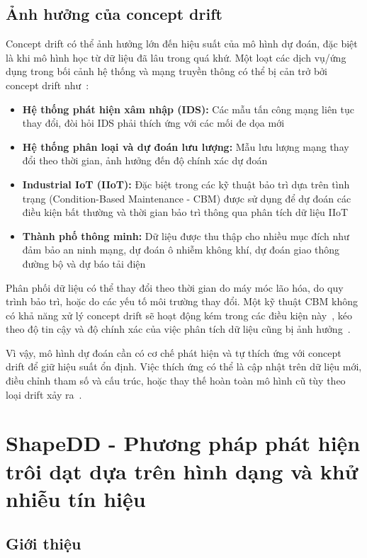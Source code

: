 \subsection{Ảnh hưởng của concept drift}
Concept drift có thể ảnh hưởng lớn đến hiệu suất của mô hình dự đoán, đặc biệt là khi mô hình học từ dữ liệu đã lâu trong quá khứ.
Một loạt các dịch vụ/ứng dụng trong bối cảnh hệ thống và mạng truyền thông có thể bị cản trở bởi concept drift như~\cite{ramakrishnan2014enabling}:

\begin{itemize}
	\item \textbf{Hệ thống phát hiện xâm nhập (IDS):} Các mẫu tấn công mạng liên tục thay đổi, đòi hỏi IDS phải thích ứng với các mối đe dọa mới
	\item \textbf{Hệ thống phân loại và dự đoán lưu lượng:} Mẫu lưu lượng mạng thay đổi theo thời gian, ảnh hưởng đến độ chính xác dự đoán
	\item \textbf{Industrial IoT (IIoT):} Đặc biệt trong các kỹ thuật bảo trì dựa trên tình trạng (Condition-Based Maintenance - CBM) được sử dụng để dự đoán các điều kiện bất thường và thời gian bảo trì thông qua phân tích dữ liệu IIoT~\cite{jourdan2021machine}
	\item \textbf{Thành phố thông minh:} Dữ liệu được thu thập cho nhiều mục đích như đảm bảo an ninh mạng, dự đoán ô nhiễm không khí, dự đoán giao thông đường bộ và dự báo tải điện
\end{itemize}

Phân phối dữ liệu có thể thay đổi theo thời gian do máy móc lão hóa, do quy trình bảo trì, hoặc do các yếu tố môi trường thay đổi. Một kỹ thuật CBM không có khả năng xử lý concept drift sẽ hoạt động kém trong các điều kiện này~\cite{jourdan2021machine}, kéo theo độ tin cậy và độ chính xác của việc phân tích dữ liệu cũng bị ảnh hưởng~\cite{tripathi2021ensuring}.

Vì vậy, mô hình dự đoán cần có cơ chế phát hiện và tự thích ứng với concept drift để giữ hiệu suất ổn định. Việc thích ứng có thể là cập nhật trên dữ liệu mới, điều chỉnh tham số và cấu trúc, hoặc thay thế hoàn toàn mô hình cũ tùy theo loại drift xảy ra~\cite{gama2014survey, lu2018learning}.

\section{ShapeDD - Phương pháp phát hiện trôi dạt dựa trên hình dạng và khử nhiễu tín hiệu}

\subsection{Giới thiệu}

